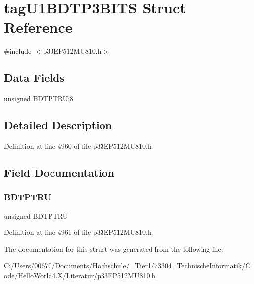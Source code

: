 \hypertarget{structtag_u1_b_d_t_p3_b_i_t_s}{}\section{tag\+U1\+B\+D\+T\+P3\+B\+I\+TS Struct Reference}
\label{structtag_u1_b_d_t_p3_b_i_t_s}


{\ttfamily \#include $<$p33\+E\+P512\+M\+U810.\+h$>$}

\subsection*{Data Fields}
\begin{DoxyCompactItemize}
\item 
unsigned \hyperlink{structtag_u1_b_d_t_p3_b_i_t_s_a00b12c33a11d35a90c4008b03ec822ce}{B\+D\+T\+P\+T\+RU}\+:8
\end{DoxyCompactItemize}


\subsection{Detailed Description}


Definition at line 4960 of file p33\+E\+P512\+M\+U810.\+h.



\subsection{Field Documentation}
\mbox{\label{structtag_u1_b_d_t_p3_b_i_t_s_a00b12c33a11d35a90c4008b03ec822ce}} 
\subsubsection{\texorpdfstring{B\+D\+T\+P\+T\+RU}{BDTPTRU}}
{\footnotesize\ttfamily unsigned B\+D\+T\+P\+T\+RU}



Definition at line 4961 of file p33\+E\+P512\+M\+U810.\+h.



The documentation for this struct was generated from the following file\+:\begin{DoxyCompactItemize}
\item 
C\+:/\+Users/00670/\+Documents/\+Hochschule/\+\_\+\+Tier1/73304\+\_\+\+Technische\+Informatik/\+Code/\+Hello\+World4.\+X/\+Literatur/\hyperlink{p33_e_p512_m_u810_8h}{p33\+E\+P512\+M\+U810.\+h}\end{DoxyCompactItemize}
